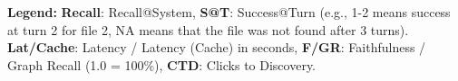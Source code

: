 \vspace{-1em}
\noindent \small \textbf{Legend:} \textbf{Recall}: Recall@System, \textbf{S@T}: Success@Turn (e.g., 1-2 means success at turn 2 for file 2, NA means that the file was not found after 3 turns). \textbf{Lat/Cache}: Latency / Latency (Cache) in seconds, \textbf{F/GR}: Faithfulness / Graph Recall (1.0 = 100\%), \textbf{CTD}: Clicks to Discovery.
